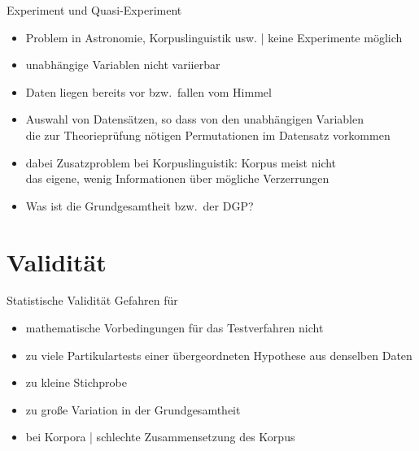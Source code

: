 \begin{frame}
  {Experiment und Quasi-Experiment}
  \begin{itemize}[<+->]
    \item Problem in Astronomie, Korpuslinguistik usw. | keine Experimente möglich
    \item \alert{unabhängige Variablen nicht variierbar}
    \item Daten liegen bereits vor bzw.\ fallen vom Himmel
    \item Auswahl von Datensätzen, so dass von den unabhängigen Variablen\\
      die zur Theorieprüfung nötigen Permutationen im Datensatz vorkommen
    \item dabei Zusatzproblem bei Korpuslinguistik: Korpus meist nicht\\
      das eigene, wenig Informationen über mögliche Verzerrungen
      \Zeile
    \item \alert{Was ist die Grundgesamtheit bzw.\ der DGP?}
  \end{itemize}
\end{frame}


\section{Validität}

\begin{frame}
  {Statistische Validität}
  Gefahren für \\
  \Zeile
  \begin{itemize}[<+->]
    \item \alert{mathematische Vorbedingungen} für das Testverfahren nicht
    \item \alert{zu viele Partikulartests} einer übergeordneten Hypothese aus denselben Daten
    \item zu \alert{kleine Stichprobe}
    \item zu große Variation in der Grundgesamtheit
      \Zeile
    \item bei Korpora | schlechte Zusammensetzung des Korpus
  \end{itemize}
\end{frame}


